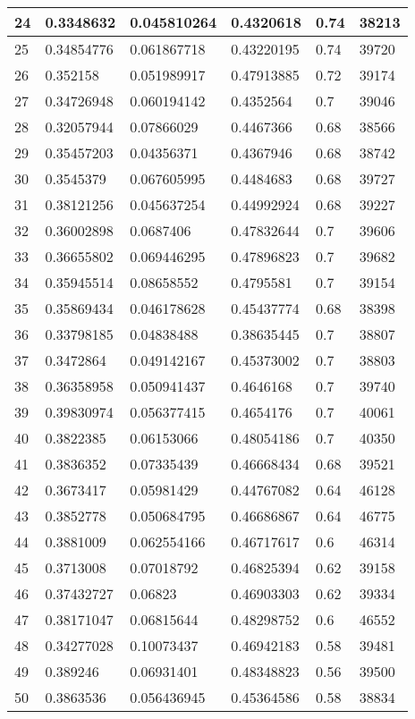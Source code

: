 \begin{longtable}{|l|l|l|l|l|l|}
24 & 0.3348632 & 0.045810264 & 0.4320618 & 0.74 & 38213 \\ \hline 
25 & 0.34854776 & 0.061867718 & 0.43220195 & 0.74 & 39720 \\ \hline 
26 & 0.352158 & 0.051989917 & 0.47913885 & 0.72 & 39174 \\ \hline 
27 & 0.34726948 & 0.060194142 & 0.4352564 & 0.7 & 39046 \\ \hline 
28 & 0.32057944 & 0.07866029 & 0.4467366 & 0.68 & 38566 \\ \hline 
29 & 0.35457203 & 0.04356371 & 0.4367946 & 0.68 & 38742 \\ \hline 
30 & 0.3545379 & 0.067605995 & 0.4484683 & 0.68 & 39727 \\ \hline 
31 & 0.38121256 & 0.045637254 & 0.44992924 & 0.68 & 39227 \\ \hline 
32 & 0.36002898 & 0.0687406 & 0.47832644 & 0.7 & 39606 \\ \hline 
33 & 0.36655802 & 0.069446295 & 0.47896823 & 0.7 & 39682 \\ \hline 
34 & 0.35945514 & 0.08658552 & 0.4795581 & 0.7 & 39154 \\ \hline 
35 & 0.35869434 & 0.046178628 & 0.45437774 & 0.68 & 38398 \\ \hline 
36 & 0.33798185 & 0.04838488 & 0.38635445 & 0.7 & 38807 \\ \hline 
37 & 0.3472864 & 0.049142167 & 0.45373002 & 0.7 & 38803 \\ \hline 
38 & 0.36358958 & 0.050941437 & 0.4646168 & 0.7 & 39740 \\ \hline 
39 & 0.39830974 & 0.056377415 & 0.4654176 & 0.7 & 40061 \\ \hline 
40 & 0.3822385 & 0.06153066 & 0.48054186 & 0.7 & 40350 \\ \hline 
41 & 0.3836352 & 0.07335439 & 0.46668434 & 0.68 & 39521 \\ \hline 
42 & 0.3673417 & 0.05981429 & 0.44767082 & 0.64 & 46128 \\ \hline 
43 & 0.3852778 & 0.050684795 & 0.46686867 & 0.64 & 46775 \\ \hline 
44 & 0.3881009 & 0.062554166 & 0.46717617 & 0.6 & 46314 \\ \hline 
45 & 0.3713008 & 0.07018792 & 0.46825394 & 0.62 & 39158 \\ \hline 
46 & 0.37432727 & 0.06823 & 0.46903303 & 0.62 & 39334 \\ \hline 
47 & 0.38171047 & 0.06815644 & 0.48298752 & 0.6 & 46552 \\ \hline 
48 & 0.34277028 & 0.10073437 & 0.46942183 & 0.58 & 39481 \\ \hline 
49 & 0.389246 & 0.06931401 & 0.48348823 & 0.56 & 39500 \\ \hline 
50 & 0.3863536 & 0.056436945 & 0.45364586 & 0.58 & 38834 \\ \hline 
\end{longtable}